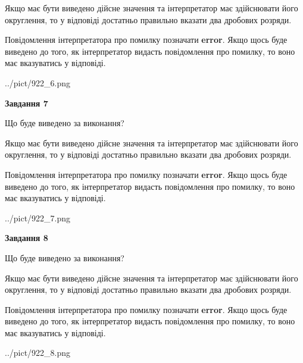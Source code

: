 \documentclass[12pt, ukrainian]{article}
\begin{document}
{\begin {Large}
Якщо має бути виведено дійсне значення та інтерпретатор має здійснювати його округлення, 
то у відповіді достатньо правильно вказати два дробових розряди.

Повідомлення інтерпретатора про помилку позначати \textbf{error}.
Якщо щось буде виведено до того, як інтерпретатор видасть повідомлення про помилку, 
то воно має вказуватись у відповіді. \par

\begin{center}
	{../pict/922_6.png}
\end{center}
\newpage

{\begin {center}\textbf{Завдання 7}\end {center}}\par
Що буде виведено за виконання? \par

Якщо має бути виведено дійсне значення та інтерпретатор має здійснювати його округлення, 
то у відповіді достатньо правильно вказати два дробових розряди.

Повідомлення інтерпретатора про помилку позначати \textbf{error}.
Якщо щось буде виведено до того, як інтерпретатор видасть повідомлення про помилку, 
то воно має вказуватись у відповіді. \par

\begin{center}
	{../pict/922_7.png}
\end{center}
\newpage

{\begin {center}\textbf{Завдання 8}\end {center}}\par
Що буде виведено за виконання? \par

Якщо має бути виведено дійсне значення та інтерпретатор має здійснювати його округлення, 
то у відповіді достатньо правильно вказати два дробових розряди.

Повідомлення інтерпретатора про помилку позначати \textbf{error}.
Якщо щось буде виведено до того, як інтерпретатор видасть повідомлення про помилку, 
то воно має вказуватись у відповіді. \par

\begin{center}
	{../pict/922_8.png}
\end{center}
\newpage


\end{Large}}
\end{document}
